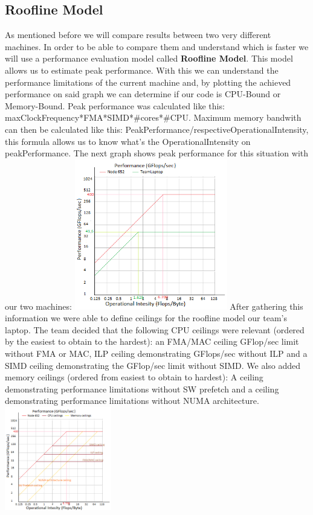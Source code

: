 \documentclass[journal]{IEEEtran}
\begin{document}
\subsection{Roofline Model}
As mentioned before we will compare results between two very different machines. In order to be able to compare them and understand which is faster we will use a performance evaluation model called \textbf{Roofline Model}. This model allows us to estimate peak performance. With this we can understand the performance limitations of the current machine and, by plotting the achieved performance on said graph we can determine if our code is CPU-Bound or Memory-Bound. Peak performance was calculated like this: maxClockFrequency*FMA*SIMD*#cores*#CPU. Maximum memory bandwith can then be calculated like this: PeakPerformance/respectiveOperationalIntensity, this formula allows us to know what's the OperationalIntensity on peakPerformance. The next graph shows peak performance for this situation with our two machines:
\includegraphics[width=0.5\textwidth]{roof1.png}
 After gathering this information we were able to define ceilings for the roofline model our team's laptop. The team decided that the following CPU ceilings were relevant (ordered by the easiest to obtain to the hardest): an FMA/MAC ceiling GFlop/sec limit without FMA or MAC, ILP ceiling demonstrating GFlops/sec without ILP and a SIMD ceiling demonstrating the GFlop/sec limit without SIMD. We also added memory ceilings (ordered from easiest to obtain to hardest): A ceiling demonstrating performance limitations without SW prefetch and a ceiling demonstrating performance limitations without NUMA architecture.
 \includegraphics[width=0.35\textwidth]{roof4.png}
\end{document}
